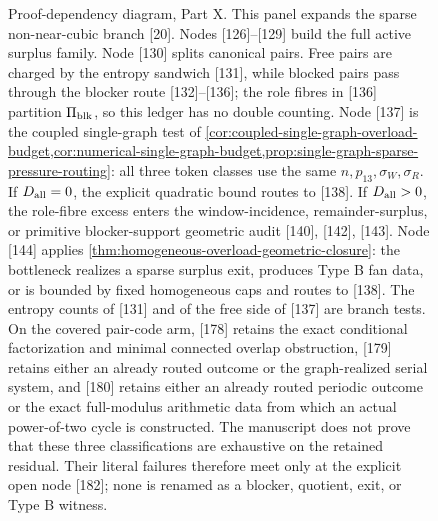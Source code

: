 \documentclass[11pt]{article}
\begin{document}
\begin{figure}[p]
\caption[Proof-dependency diagram, Part X]{Proof-dependency diagram, Part X.  This panel expands the sparse non-near-cubic branch [20].  Nodes [126]--[129] build the full active surplus family.  Node [130] splits canonical pairs.  Free pairs are charged by the entropy sandwich [131], while blocked pairs pass through the blocker route [132]--[136]; the role fibres in [136] partition \(\Pi_{\rm blk}\), so this ledger has no double counting.  Node [137] is the coupled single-graph test of \cref{cor:coupled-single-graph-overload-budget,cor:numerical-single-graph-budget,prop:single-graph-sparse-pressure-routing}: all three token classes use the same \(n,p_{13},\sigma_W,\sigma_R\).  If \(D_{\rm all}=0\), the explicit quadratic bound routes to [138].  If \(D_{\rm all}>0\), the role-fibre excess enters the window-incidence, remainder-surplus, or primitive blocker-support geometric audit [140], [142], [143].  Node [144] applies \cref{thm:homogeneous-overload-geometric-closure}: the bottleneck realizes a sparse surplus exit, produces Type B fan data, or is bounded by fixed homogeneous caps and routes to [138].  The entropy counts of [131] and of the free side of [137] are branch tests.  On the covered pair-code arm, [178] retains the exact conditional factorization and minimal connected overlap obstruction, [179] retains either an already routed outcome or the graph-realized serial system, and [180] retains either an already routed periodic outcome or the exact full-modulus arithmetic data from which an actual power-of-two cycle is constructed.  The manuscript does not prove that these three classifications are exhaustive on the retained residual.  Their literal failures therefore meet only at the explicit open node [182]; none is renamed as a blocker, quotient, exit, or Type B witness.}
\label{fig:proof-diagram-part-x}
\end{figure}

\clearpage
\end{document}
